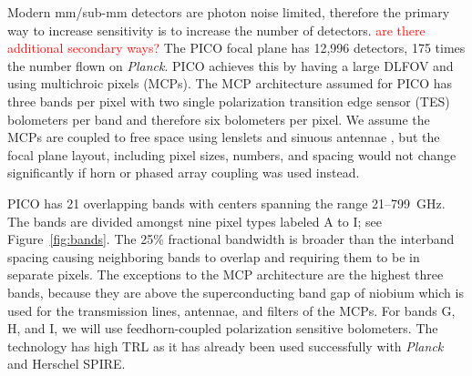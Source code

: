 \documentclass[]{spie}  %
\newcommand{\comr}[1]{\textcolor{red}{#1}}
\newcommand{\comb}[1]{\textcolor{blue}{#1}}
\begin{document}
Modern mm/sub-mm detectors are photon noise limited, therefore the primary way to increase sensitivity is to increase the 
number of detectors. 
\comr{are there additional secondary ways?}  %
The PICO focal plane has 12,996 detectors, 175 times the number flown on \textit{Planck}. PICO achieves this by 
having a large DLFOV and using multichroic pixels (MCPs)\cite{Suzuki2014_samps,datta2014_mcp}. 
The MCP architecture assumed for PICO has three bands per pixel with two single polarization transition 
edge sensor (TES) bolometers per band and therefore six bolometers per pixel. 
We assume the MCPs are coupled to free space using lenslets and sinuous antennae \cite{Suzuki2014_samps}, 
but the focal plane layout, including pixel sizes, numbers, and spacing would not change significantly 
if horn or phased array coupling was used instead.

PICO has 21 overlapping bands with centers spanning the range 21--799~GHz. The bands are divided amongst 
nine pixel types labeled A to I; see Figure~\ref{fig:bands}. 
The 25\% fractional bandwidth is broader than the interband spacing causing neighboring bands to 
overlap and requiring them to be in separate pixels. 
The exceptions to the MCP architecture are the highest three bands, because they are above the superconducting 
band gap of niobium which is used for the transmission lines, antennae, and filters of the MCPs.  
For bands G, H, and I, we will use feedhorn-coupled polarization sensitive bolometers. The technology has high TRL 
as it has already been used successfully with 
\textit{Planck}\cite{planck2010_hfi} and Herschel SPIRE\cite{spire2010}.
\end{document}
